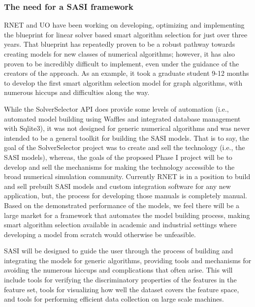 \subsubsection{The need for a SASI framework} 

RNET and UO have been working on developing, optimizing and implementing the blueprint for linear solver based smart algorithm selection for just over three years. That blueprint has repeatedly proven to be a robust pathway towards creating models for new classes of numerical algorithms; however, it has also proven to be incredibly difficult to implement, even under the guidance of the creators of the approach. As an example, it took a graduate student 9-12 months to develop the first smart algorithm selection model for graph algorithms, with numerous hiccups and difficulties along the way. 

While the SolverSelector API does provide some levels of automation (i.e., automated model building using Waffles and integrated database management with Sqlite3), it was not designed for generic numerical algorithms and was never intended to be a general toolkit for building the SASI models. That is to say, the goal of the SolverSelector project was to create and sell the technology (i.e., the SASI models), whereas, the goals of the proposed Phase I project will be to develop and sell the mechanisms for making the technology accessible to the broad numerical simulation community. Currently RNET is in a position to build and sell prebuilt SASI models and custom integration software for any new application, but, the process for developing those manuals is completely manual. Based on the demonstrated performance of the models, we feel there will be a large market for a framework that automates the model building process, making smart algorithm selection available in academic and industrial settings where developing a model from scratch would otherwise be unfeasible.  

SASI will be designed to guide the user through the process of building and integrating the models for generic algorithms, providing tools and mechanisms for avoiding the numerous hiccups and complications that often arise. This will include tools for verifying the discriminatory properties of the features in the feature set, tools for visualizing how well the dataset covers the feature space, and tools for performing efficient data collection on large scale machines. 

